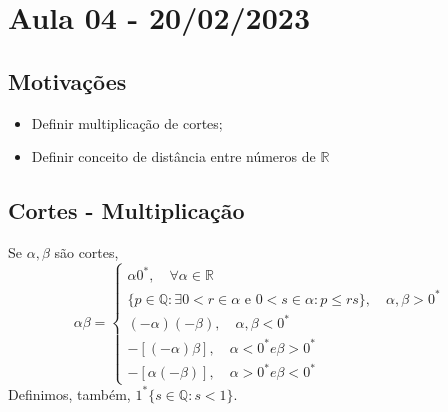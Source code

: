 \documentclass[analysis_notes.tex]{subfiles}
\begin{document}
\section{Aula 04 - 20/02/2023}
\subsection{Motiva\c c\~oes}
\begin{itemize}
	\item Definir multiplica\c c\~ao de cortes;
	\item Definir conceito de dist\^ancia entre n\'umeros de $\mathbb{R}$
\end{itemize}
\subsection{Cortes - Multiplica\c c\~ao}
\begin{def*}
	Se $\alpha, \beta$ s\~ao cortes,
	$$
		\alpha\beta = \left\{\begin{array}{ll}
			\alpha0^*, \quad\forall \alpha\in \mathbb{R}                                                            \\
			\{p\in\mathbb{Q}: \exists0 < r\in\alpha \text{ e }0 < s\in\alpha: p \leq rs\},\quad \alpha, \beta > 0^* \\
			(-\alpha)(-\beta), \quad \alpha, \beta < 0^*                                                            \\
			-[(-\alpha)\beta], \quad \alpha < 0^* e \beta > 0^*                                                     \\
			-[\alpha(-\beta)], \quad \alpha > 0^* e \beta < 0^*
		\end{array}\right.
	$$
	Definimos, tamb\'em, $1^*\{s\in\mathbb{Q}: s < 1\}$.
\end{def*}
\newpage
\end{document}
